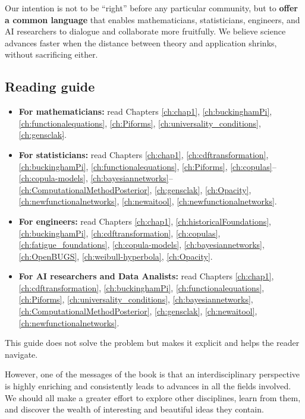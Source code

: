 Our intention is not to be ``right'' before any particular community, but to \textbf{offer a common language} that enables mathematicians, statisticians, engineers, and AI researchers to dialogue and collaborate more fruitfully. We believe science advances faster when the distance between theory and application shrinks, without sacrificing either.


\subsection*{Reading guide}
\begin{itemize}
    \item \textbf{For mathematicians:} read Chapters \ref{ch:chap1}, \ref{ch:buckinghamPi}, \ref{ch:functionalequations}, \ref{ch:Piforms}, \ref{ch:universality_conditions}, \ref{ch:gensclak}$\tilde{}$.
    \item \textbf{For statisticians:} read Chapters \ref{ch:chap1}, \ref{ch:cdftransformation}, \ref{ch:buckinghamPi}, \ref{ch:functionalequations}, \ref{ch:Piforms}, \ref{ch:copulas}--\ref{ch:copula-models}, \ref{ch:bayesiannetworks}--\ref{ch:ComputationalMethodPosterior}, \ref{ch:gensclak}, \ref{ch:Opacity}, \ref{ch:newfunctionalnetworks}, \ref{ch:newaitool}, \ref{ch:newfunctionalnetworks}.
    \item \textbf{For engineers:} read Chapters \ref{ch:chap1}, \ref{ch:historicalFoundations}, \ref{ch:buckinghamPi}, \ref{ch:cdftransformation}, \ref{ch:copulas}, \ref{ch:fatigue_foundations}, \ref{ch:copula-models}, \ref{ch:bayesiannetworks}, \ref{ch:OpenBUGS}, \ref{ch:weibull-hyperbola}, \ref{ch:Opacity}.
    \item \textbf{For AI researchers and Data Analists:} read Chapters \ref{ch:chap1}, \ref{ch:cdftransformation}, \ref{ch:buckinghamPi}, \ref{ch:functionalequations}, \ref{ch:Piforms}, \ref{ch:universality_conditions}, \ref{ch:bayesiannetworks}, \ref{ch:ComputationalMethodPosterior}, \ref{ch:gensclak}, \ref{ch:newaitool}, \ref{ch:newfunctionalnetworks}.
\end{itemize}

This guide does not solve the problem but makes it explicit and helps the reader navigate.

However, one of the messages of the book is that an interdisciplinary perspective is highly enriching and consistently leads to advances in all the fields involved. We should all make a greater effort to explore other disciplines, learn from them, and discover the wealth of interesting and beautiful ideas they contain.


